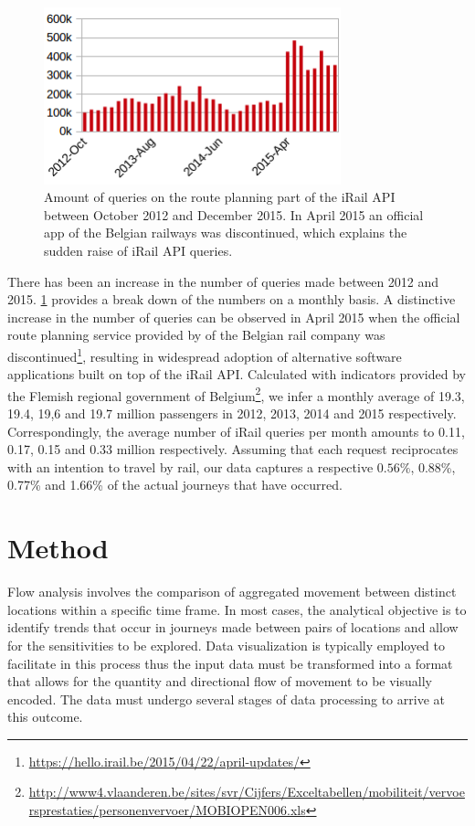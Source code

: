\documentclass{sig-alternate}
\begin{document}
\begin{figure}
\centering
\includegraphics[width=8.6cm]{querylogs}
\caption{Amount of queries on the route planning part of the iRail API between October 2012 and December 2015. In April 2015 an official app of the Belgian railways was discontinued, which explains the sudden raise of iRail API queries.}
\label{fig:querylogs}
\end{figure}

There has been an increase in the number of queries made between 2012 and 2015. 
\cref{fig:querylogs} provides a break down of the numbers on a monthly basis. 
A distinctive increase in the number of queries can be observed in April 2015 when the official route planning service provided by of the Belgian rail company was discontinued\footnote{\url{https://hello.irail.be/2015/04/22/april-updates/}}, resulting in widespread adoption of alternative software applications built on top of the iRail API.
Calculated with indicators provided by the Flemish regional government of Belgium\footnote{\url{http://www4.vlaanderen.be/sites/svr/Cijfers/Exceltabellen/mobiliteit/vervoersprestaties/personenvervoer/MOBIOPEN006.xls}}, we infer a monthly average of 19.3, 19.4, 19,6 and 19.7 million passengers in 2012, 2013, 2014 and 2015 respectively. 
Correspondingly, the average number of iRail queries per month amounts to 0.11, 0.17, 0.15 and 0.33 million respectively.
Assuming that each request reciprocates with an intention to travel by rail, our data captures a respective $0.56\%$, 0.88\%, 0.77\% and 1.66\% of the actual journeys that have occurred.


\section{Method}
\label{sec:method}

Flow analysis involves the comparison of aggregated movement between distinct locations within a specific time frame. 
In most cases, the analytical objective is to identify trends that occur in journeys made between pairs of locations and allow for the sensitivities to be explored. 
Data visualization is typically employed to facilitate in this process thus the input data must be transformed into a format that allows for the quantity and directional flow of movement to be visually encoded.
The data must undergo several stages of data processing to arrive at this outcome.
\end{document}
